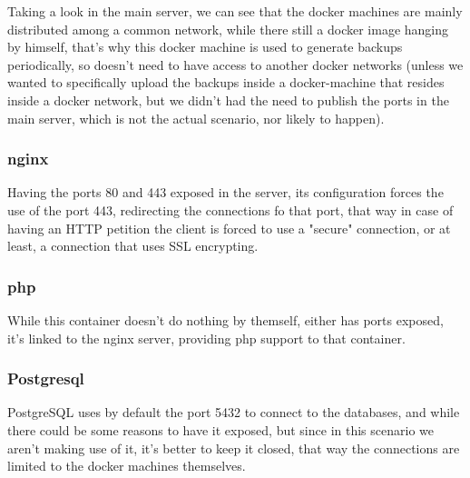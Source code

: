 \documentclass[11pt]{article}
\begin{document}
    \begin{flushleft}
        Taking a look in the main server, we can see that the docker machines are mainly distributed among a common network,
        while there still a docker image hanging by himself, that's why this docker machine is used to generate backups
        periodically, so doesn't need to have access to another docker networks (unless we wanted to specifically upload
        the backups inside a docker-machine that resides inside a docker network, but we didn't had the need
        to publish the ports in the main server, which is not the actual scenario, nor likely to happen).
    \end{flushleft}

    \subsubsection[Nginx]{nginx}
    \begin{flushleft}
        Having the ports 80 and 443 exposed in the server, its configuration forces the use of the port 443, redirecting
        the connections fo that port, that way in case of having an HTTP petition the client is forced to use a "secure"
        connection, or at least, a connection that uses SSL encrypting.
    \end{flushleft}

    \subsubsection[PHP]{php}
    \begin{flushleft}
        While this container doesn't do nothing by themself, either has ports exposed, it's linked to the nginx server, providing php support
        to that container.
    \end{flushleft}

    \subsubsection[Postgresql]{Postgresql}
    \begin{flushleft}
        PostgreSQL uses by default the port 5432 to connect to the databases, and while there could be some reasons to
        have it exposed, but since in this scenario we aren't making use of it, it's better to keep it closed, that way
        the connections are limited to the docker machines themselves.
    \end{flushleft}
\end{document}
